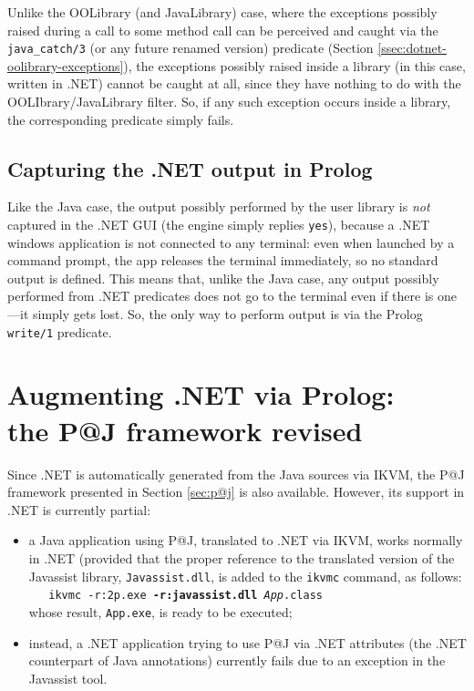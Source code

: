 Unlike the OOLibrary (and JavaLibrary) case, where the exceptions possibly raised during a call to some method call can be perceived and caught via the \texttt{java\_catch/3} (or any future renamed version) predicate (Section \ref{ssec:dotnet-oolibrary-exceptions}), the exceptions possibly raised inside a library (in this case, written in .NET) cannot be caught at all, since they have nothing to do with the OOLIbrary/JavaLibrary filter.
So, if any such exception occurs inside a library, the corresponding predicate simply fails.

\subsection{Capturing the .NET output in Prolog}

Like the Java case, the output possibly performed by the user library is \textit{not} captured in the \tuprolog{}.NET GUI (the engine simply replies \texttt{yes}), because a .NET windows application is not connected to any terminal: even when launched by a command prompt, the app releases the terminal immediately, so no standard output is defined.
This means that, unlike the Java case, any output possibly performed from .NET predicates does not go to the terminal even if there is one---it simply gets lost. So, the only way to perform output is via the Prolog \texttt{write/1} predicate.



\section{Augmenting .NET via Prolog:\\the P@J framework revised}
\label{sec:dotnet-pj}

Since \tuprolog{}.NET is automatically generated from the Java sources via IKVM, the P@J framework presented in Section \ref{sec:p@j} is also available.
%
However, its support in .NET is currently partial:
\begin{itemize}
  \item a Java application using P@J, translated to .NET via IKVM, works normally in .NET (provided that the proper reference to the translated version of the Javassist library, \texttt{Javassist.dll}, is added to the \texttt{ikvmc} command, as follows:\\
      \texttt{\mbox{~~~}ikvmc -r:2p.exe \textbf{-r:javassist.dll} \textit{App}.class }\\
      whose result, \texttt{App.exe}, is ready to be executed;

  \item instead, a .NET application trying to use P@J via .NET attributes (the .NET counterpart of Java annotations) currently fails due to an exception in the Javassist tool.
\end{itemize}

